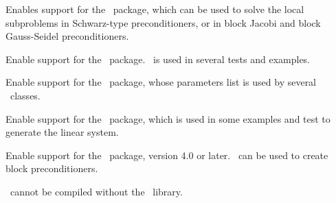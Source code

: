 \medskip

{Enables support for the \amesos~package, which can be used to solve the
  local subproblems in Schwarz-type preconditioners, or in
    block Jacobi and block Gauss-Seidel preconditioners.}

{Enable support for the \aztecoo\ package. \aztecoo~is used in several tests
  and examples.}

{Enable support for the \teuchos\ package, whose parameters list is used by
  several \ifpack\ classes.}

{Enable support for the \triutils\ package, which is used in some examples and
  test to generate the linear system.}

{Enable support for the \metis\ package, version 4.0 or later. \metis\ can be
  used to create block preconditioners.}

\begin{remark}
\ifpack\ cannot be compiled without the \epetra\ library.
\end{remark}



